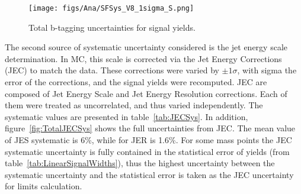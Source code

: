 \begin{figure}[!Hhtbp]
  \begin{center}
    \texttt{[image: figs/Ana/SFSys\_V8\_1sigma\_S.png]}
    \caption{Total b-tagging uncertainties for signal yields.}
    \label{fig:TotalSFSys}
  \end{center}
\end{figure}

The second source of systematic uncertainty considered is the jet energy scale determination. In MC, this scale is corrected via the Jet Energy Corrections (JEC) to match the data. These corrections were varied by $\pm 1\sigma$, with sigma the error of the corrections, and the signal yields were recomputed. JEC are composed of Jet Energy Scale and Jet Energy Resolution corrections. Each of them were treated as uncorrelated, and thus varied independently. The systematic values are presented in table~\ref{tab:JECSys}. In addition, figure~\ref{fig:TotalJECSys} shows the full uncertainties from JEC. The mean value of JES systematic is 6\%, while for JER is 1.6\%. For some mass points the JEC systematic uncertainty is fully contained in the statistical error of yields (from table~\ref{tab:LinearSignalWidths}), thus the highest uncertainty between the systematic uncertainty and the statistical error is taken as the JEC uncertainty for limits calculation.

\begin{table*}[htbH]
\begin{center}
\caption{JEC uncertainties for signal yields.\label{tab:JECSys}}
\end{center}
\end{table*}

